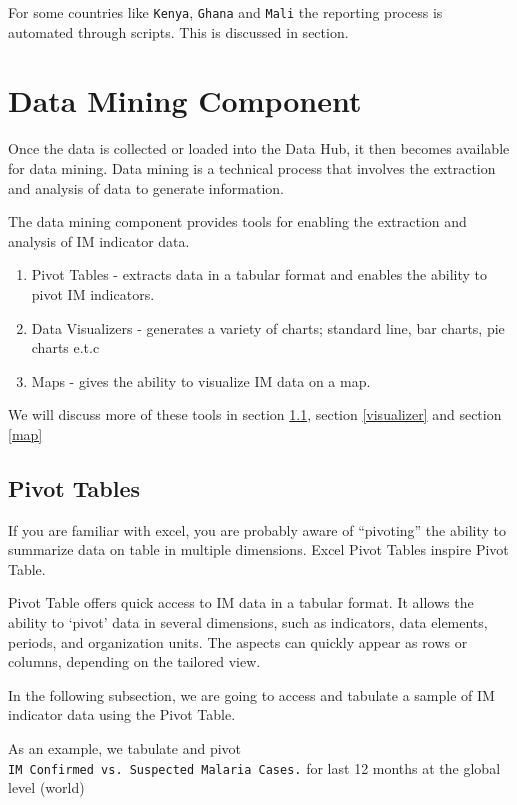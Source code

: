 \documentclass[]{book}
\providecommand{\tightlist}{%
  \setlength{\itemsep}{0pt}\setlength{\parskip}{0pt}}
\begin{document}
For some countries like \texttt{Kenya}, \texttt{Ghana} and \texttt{Mali} the reporting process is automated through scripts. This is discussed in section.

\hypertarget{data-mining-component}{%
\section{Data Mining Component}\label{data-mining-component}}

Once the data is collected or loaded into the Data Hub, it then becomes available for data mining. Data mining is a technical process that involves the extraction and analysis of data to generate information.

The data mining component provides tools for enabling the extraction and analysis of IM indicator data.

\begin{enumerate}
\def\labelenumi{\arabic{enumi}.}
\tightlist
\item
  Pivot Tables - extracts data in a tabular format and enables the ability to pivot IM indicators.
\item
  Data Visualizers - generates a variety of charts; standard line, bar charts, pie charts e.t.c
\item
  Maps - gives the ability to visualize IM data on a map.
\end{enumerate}

We will discuss more of these tools in section \ref{pivot}, section \ref{visualizer} and section \ref{map}

\hypertarget{pivot}{%
\subsection{Pivot Tables}\label{pivot}}

If you are familiar with excel, you are probably aware of ``pivoting'' the ability to summarize data on table in multiple dimensions. Excel Pivot Tables inspire Pivot Table.

Pivot Table offers quick access to IM data in a tabular format. It allows the ability to `pivot' data in several dimensions, such as indicators, data elements, periods, and organization units. The aspects can quickly appear as rows or columns, depending on the tailored view.

In the following subsection, we are going to access and tabulate a sample of IM indicator data using the Pivot Table.

As an example, we tabulate and pivot \texttt{IM\ Confirmed\ vs.\ Suspected\ Malaria\ Cases.} for last 12 months at the global level (world)
\end{document}
